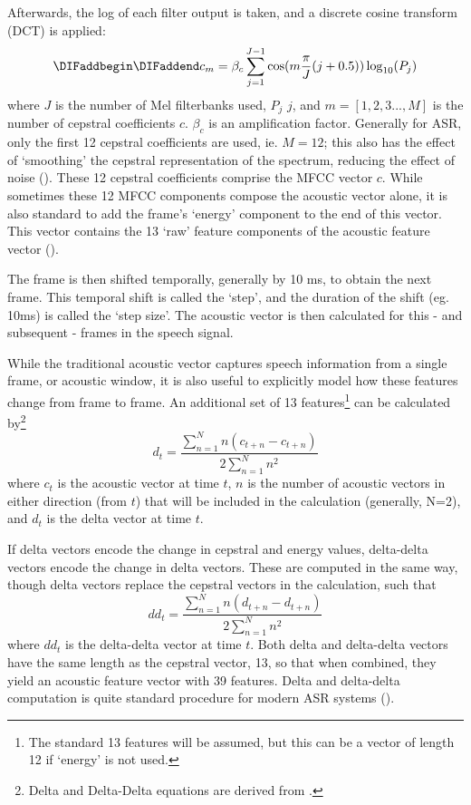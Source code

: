 Afterwards, the log of each filter output is taken, and a discrete cosine transform (DCT) is applied: \begin{equation}\DIFaddbegin \label{eq:mfcc-calculation} \DIFaddend c_m = \beta_c \sum_{j=1}^{J-1} \cos(m\dfrac{\pi}{J} (j+0.5)) \log_{10} (P_j) \end{equation} where $J$ is the number of Mel filterbanks used, $P_j$ \DIFdelbegin {}\DIFdelend \DIFaddbegin {}\DIFaddend $j$\DIFdelbegin {}\DIFdelend , and $m=[1,2,3...,M]$ is the number of cepstral coefficients $c$.  $\beta_c$ is an amplification factor.  Generally for ASR, only the first 12 cepstral coefficients are used, ie. $M=12$; this also has the effect of `smoothing' the cepstral representation of the spectrum, reducing the effect of noise (\cite{gold:11}).  These 12 cepstral coefficients comprise the MFCC vector $c$.  While sometimes these 12 MFCC components compose the acoustic vector alone, it is also standard to add the frame's `energy' component to the end of this vector.  This vector contains the 13 `raw' feature components of the acoustic feature vector (\cite{jurafsky:09}).  

The frame is then shifted temporally, generally by 10 ms, to obtain the next frame. This temporal shift is called the `step', and the duration of the shift (eg. 10ms) is called the `step size'.  The acoustic vector is then calculated for this - and subsequent - frames in the speech signal.

While the traditional acoustic vector captures speech information from a single frame, or acoustic window, it is also useful to explicitly model how these features change from frame to frame.  An additional set of 13 features\footnote{The standard 13 features will be assumed, but this can be a vector of length 12 if `energy' is not used.} can be calculated by\footnote{Delta and Delta-Delta equations are derived from \cite{gold:11}.} \begin{equation} d_t = \dfrac{\sum_{n=1}^{N} n(c_{t+n} - c_{t+n})}{2\sum_{n=1}^{N} n^2} \end{equation} where $c_t$ is the acoustic vector at time $t$, $n$ is the number of acoustic vectors in either direction (from $t$) that will be included in the calculation (generally, N=2), and $d_t$ is the delta vector at time $t$.  

If delta vectors encode the change in cepstral and energy values, delta-delta vectors encode the change in delta vectors.  These are computed in the same way, though delta vectors replace the cepstral vectors in the calculation, such that \begin{equation} dd_t = \dfrac{\sum_{n=1}^{N} n(d_{t+n} - d_{t+n})}{2\sum_{n=1}^{N} n^2} \end{equation} where $dd_t$ is the delta-delta vector at time $t$.  Both delta and delta-delta vectors have the same length as the cepstral vector, 13, so that when combined, they yield an acoustic feature vector with 39 features.  %
Delta and delta-delta computation is quite standard procedure for modern ASR systems (\cite{htk:15}).


